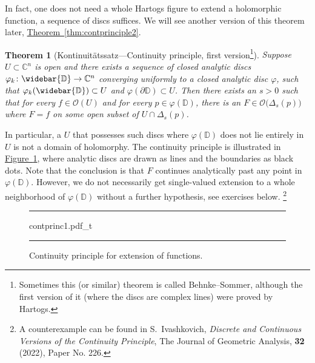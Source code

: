 \documentclass[12pt,openany]{book}
\newcommand{\C}{{\mathbb{C}}}
\newcommand{\D}{{\mathbb{D}}}
\newcommand{\sO}{{\mathscr{O}}}
\theoremstyle{plain}
\newtheorem{thm}{Theorem}[section]
\theoremstyle{remark}
\theoremstyle{definition}
\newenvironment{myfig}{%
\begin{figure}[h!t]
\noindent\rule{\textwidth}{0.5pt}\vspace{12pt}\par\centering}%
{\par\noindent\rule{\textwidth}{0.5pt}
\end{figure}}
\theoremstyle{exercise}
\theoremstyle{example}
\newcommand{\figureref}[1]{\hyperref[#1]{Figure~\ref*{#1}}}
\newcommand{\thmref}[1]{\hyperref[#1]{Theorem~\ref*{#1}}}
\begin{document}
In fact, one does not need a whole Hartogs figure to extend a holomorphic
function, a sequence of discs suffices.  We will see another version of
this theorem later, \thmref{thm:contprinciple2}.

\begin{thm}[Kontinuit\"atssatz---Continuity
principle, first version\footnote{%
Sometimes this (or similar) theorem is called Behnke--Sommer, although the
first version of it (where the discs are complex lines) were proved by Hartogs.}]
\label{thm:contprinciple1}
Suppose $U \subset \C^n$ is open and there exists a sequence of
closed analytic discs $\varphi_k \colon \widebar{\D} \to \C^n$ converging
uniformly to a closed analytic disc $\varphi$, such that
$\varphi_k(\widebar{\D}) \subset U$ and $\varphi(\partial \D) \subset U$.
Then there exists an $s > 0$ such that for every $f \in \sO(U)$
and for every $p \in \varphi(\D)$,
there is an $F \in \sO\bigl(\Delta_s(p)\bigr)$ where $F=f$ on some
open subset of $U \cap \Delta_s(p)$.
\end{thm}

In particular, a $U$ that possesses such discs where $\varphi(\D)$ does not
lie entirely in $U$ is not a domain of holomorphy.
The continuity principle is illustrated in \figureref{fig:contprinc1}, where
analytic discs are drawn as lines and the boundaries as black dots.
Note that the conclusion is that $F$ continues analytically past any point
in $\varphi(\D)$.
However, we do not necessarily get single-valued extension to a whole
neighborhood of $\varphi(\D)$ without a further hypothesis,
see exercises below.%
\footnote{A counterexample can be found in S.\ Ivashkovich, \emph{Discrete
and Continuous Versions of the Continuity Principle}, The Journal of
Geometric Analysis, \textbf{32} (2022), Paper No. 226.}

\begin{myfig}
{contprinc1.pdf_t}
\caption{Continuity principle for extension of
functions.\label{fig:contprinc1}}
\end{myfig}
\end{document}
